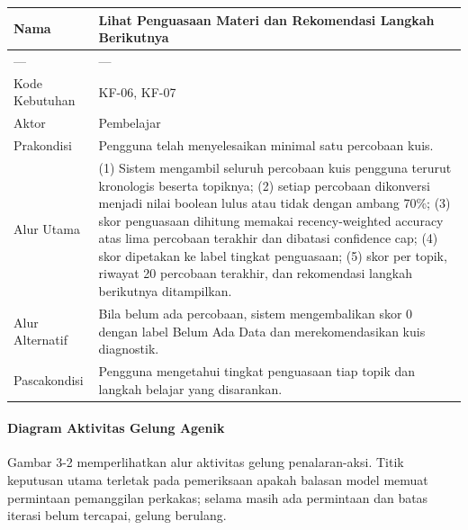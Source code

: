 \documentclass[12pt,a4paper]{article}
\begin{document}
\begin{table}[h]

\centering

\begin{tabular}{ll}

\toprule

Nama & Lihat Penguasaan Materi dan Rekomendasi Langkah Berikutnya \\

\midrule

--- & --- \\

Kode Kebutuhan & KF-06, KF-07 \\

Aktor & Pembelajar \\

Prakondisi & Pengguna telah menyelesaikan minimal satu percobaan kuis. \\

Alur Utama & (1) Sistem mengambil seluruh percobaan kuis pengguna terurut kronologis beserta topiknya; (2) setiap percobaan dikonversi menjadi nilai boolean lulus atau tidak dengan ambang 70\%; (3) skor penguasaan dihitung memakai recency-weighted accuracy atas lima percobaan terakhir dan dibatasi confidence cap; (4) skor dipetakan ke label tingkat penguasaan; (5) skor per topik, riwayat 20 percobaan terakhir, dan rekomendasi langkah berikutnya ditampilkan. \\

Alur Alternatif & Bila belum ada percobaan, sistem mengembalikan skor 0 dengan label Belum Ada Data dan merekomendasikan kuis diagnostik. \\

Pascakondisi & Pengguna mengetahui tingkat penguasaan tiap topik dan langkah belajar yang disarankan. \\

\bottomrule

\end{tabular}

\end{table}

\paragraph*{Diagram Aktivitas Gelung Agenik}

Gambar 3-2 memperlihatkan alur aktivitas gelung penalaran-aksi. Titik keputusan utama terletak pada pemeriksaan apakah balasan model memuat permintaan pemanggilan perkakas; selama masih ada permintaan dan batas iterasi belum tercapai, gelung berulang.
\end{document}
